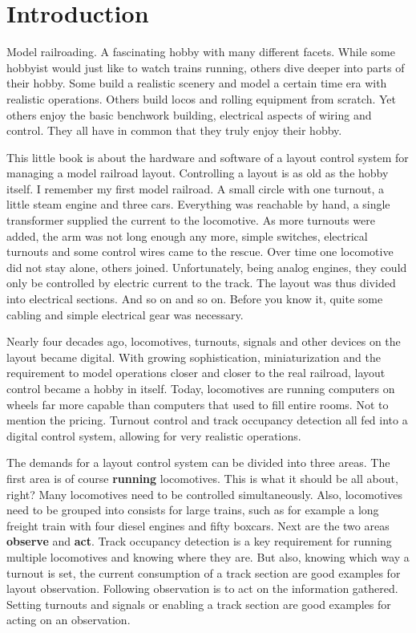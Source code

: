 \chapter*{Introduction}

Model railroading. A fascinating hobby with many different facets. While some hobbyist would just like to watch trains running, others dive deeper into parts of their hobby. Some build a realistic scenery and model a certain time era with realistic operations. Others build locos and rolling equipment from scratch. Yet others enjoy the basic benchwork building, electrical aspects of wiring and control. They all have in common that they truly enjoy their hobby.

This little book is about the hardware and software of a layout control system for managing a model railroad layout. Controlling a layout is as old as the hobby itself. I remember my first model railroad. A small circle with one turnout, a little steam engine and three cars. Everything was reachable by hand, a single transformer supplied the current to the locomotive. As more turnouts were added, the arm was not long enough any more, simple switches, electrical turnouts and some control wires came to the rescue. Over time one locomotive did not stay alone, others joined. Unfortunately, being analog engines, they could only be controlled by electric current to the track. The layout was thus divided into electrical sections. And so on and so on. Before you know it, quite some cabling and simple electrical gear was necessary.

Nearly four decades ago, locomotives, turnouts, signals and other devices on the layout became digital. With growing sophistication, miniaturization and the requirement to model operations closer and closer to the real railroad, layout control became a hobby in itself. Today, locomotives are running computers on wheels far more capable than computers that used to fill entire rooms. Not to mention the pricing. Turnout control and track occupancy detection all fed into a digital control system, allowing for very realistic operations.

The demands for a layout control system can be divided into three areas. The first area is of course {\bf running} locomotives. This is what it should be all about, right? Many locomotives need to be controlled simultaneously. Also, locomotives need to be grouped into consists for large trains, such as for example a long freight train with four diesel engines and fifty boxcars. Next are the two areas {\bf observe} and {\bf act}. Track occupancy detection is a key requirement for running multiple locomotives and knowing where they are. But also, knowing which way a turnout is set, the current consumption of a track section are good examples for layout observation. Following observation is to act on the information gathered. Setting turnouts and signals or enabling a track section are good examples for acting on an observation.

